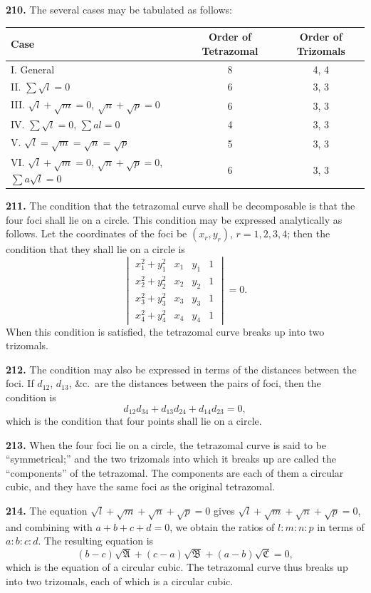\documentclass[12pt,a4paper]{article}
\theoremstyle{definition}
\begin{document}
\noindent\textbf{210.} The several cases may be tabulated as follows:
\begin{center}
\begin{tabular}{|l|c|c|}
\hline
\textbf{Case} & \textbf{Order of Tetrazomal} & \textbf{Order of Trizomals} \\
\hline
I. General & 8 & 4, 4 \\
II. $\sum\sqrt{l} = 0$ & 6 & 3, 3 \\
III. $\sqrt{l} + \sqrt{m} = 0$, $\sqrt{n} + \sqrt{p} = 0$ & 6 & 3, 3 \\
IV. $\sum\sqrt{l} = 0$, $\sum al = 0$ & 4 & 3, 3 \\
V. $\sqrt{l} = \sqrt{m} = \sqrt{n} = \sqrt{p}$ & 5 & 3, 3 \\
VI. $\sqrt{l} + \sqrt{m} = 0$, $\sqrt{n} + \sqrt{p} = 0$, $\sum a\sqrt{l} = 0$ & 6 & 3, 3 \\
\hline
\end{tabular}
\end{center}

\newpage
\noindent\textbf{211.} The condition that the tetrazomal curve shall be decomposable is that
the four foci shall lie on a circle. This condition may be expressed analytically as
follows. Let the coordinates of the foci be $(x_r, y_r)$, $r = 1, 2, 3, 4$; then the condition
that they shall lie on a circle is
\[
\begin{vmatrix}
x_1^2 + y_1^2 & x_1 & y_1 & 1 \\
x_2^2 + y_2^2 & x_2 & y_2 & 1 \\
x_3^2 + y_3^2 & x_3 & y_3 & 1 \\
x_4^2 + y_4^2 & x_4 & y_4 & 1
\end{vmatrix}
= 0.
\]
When this condition is satisfied, the tetrazomal curve breaks up into two trizomals.

\noindent\textbf{212.} The condition may also be expressed in terms of the distances between
the foci. If $d_{12}$, $d_{13}$, \&c.\ are the distances between the pairs of foci, then the condition
is
\[
d_{12}d_{34} + d_{13}d_{24} + d_{14}d_{23} = 0,
\]
which is the condition that four points shall lie on a circle.

\noindent\textbf{213.} When the four foci lie on a circle, the tetrazomal curve is said to be
``symmetrical;'' and the two trizomals into which it breaks up are called the
``components'' of the tetrazomal. The components are each of them a circular cubic,
and they have the same foci as the original tetrazomal.

\newpage
\noindent\textbf{214.} The equation $\sqrt{l} + \sqrt{m} + \sqrt{n} + \sqrt{p} = 0$ gives $\sqrt{l} + \sqrt{m} + \sqrt{n} + \sqrt{p} = 0$,
and combining with $a + b + c + d = 0$, we obtain the ratios of $l : m : n : p$ in terms
of $a : b : c : d$. The resulting equation is
\[
(b - c)\sqrt{\mathfrak{A}} + (c - a)\sqrt{\mathfrak{B}} + (a - b)\sqrt{\mathfrak{C}} = 0,
\]
which is the equation of a circular cubic. The tetrazomal curve thus breaks up into
two trizomals, each of which is a circular cubic.
\end{document}
